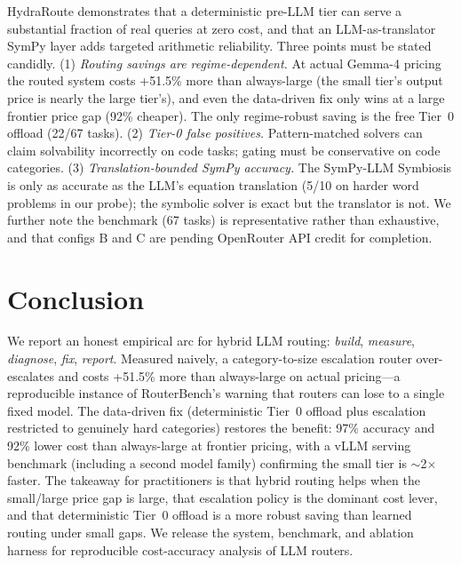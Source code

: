 \documentclass[11pt]{article}
\newcommand{\system}{HydraRoute\xspace}
\begin{document}
\system demonstrates that a deterministic pre-LLM tier can serve a substantial fraction of
real queries at zero cost, and that an LLM-as-translator SymPy layer adds targeted arithmetic
reliability. Three points must be stated candidly. (1) \emph{Routing savings are
regime-dependent.} At actual Gemma-4 pricing the routed system costs +51.5\% more than
always-large (the small tier's output price is nearly the large tier's), and even the
data-driven fix only wins at a large frontier price gap (92\% cheaper). The only
regime-robust saving is the free Tier~0 offload (22/67 tasks). (2) \emph{Tier-0 false
positives.} Pattern-matched solvers can claim solvability incorrectly on code tasks; gating
must be conservative on code categories. (3) \emph{Translation-bounded SymPy accuracy.} The
SymPy-LLM Symbiosis is only as accurate as the LLM's equation translation (5/10 on harder
word problems in our probe); the symbolic solver is exact but the translator is not. We
further note the benchmark (67 tasks) is representative rather than exhaustive, and that
configs \textsc{B} and \textsc{C} are pending OpenRouter API credit for completion.

\section{Conclusion}
\label{sec:conclusion}

We report an honest empirical arc for hybrid LLM routing: \emph{build}, \emph{measure},
\emph{diagnose}, \emph{fix}, \emph{report}. Measured naively, a category-to-size escalation
router over-escalates and costs +51.5\% more than always-large on actual pricing---a
reproducible instance of RouterBench's warning that routers can lose to a single fixed model.
The data-driven fix (deterministic Tier~0 offload plus escalation restricted to genuinely
hard categories) restores the benefit: 97\% accuracy and 92\% lower cost than always-large at
frontier pricing, with a vLLM serving benchmark (including a second model family) confirming
the small tier is $\sim$2$\times$ faster. The takeaway for practitioners is that hybrid
routing helps when the small/large price gap is large, that escalation policy is the dominant
cost lever, and that deterministic Tier~0 offload is a more robust saving than learned routing
under small gaps. We release the system, benchmark, and ablation harness for reproducible
cost-accuracy analysis of LLM routers.


\end{document}
